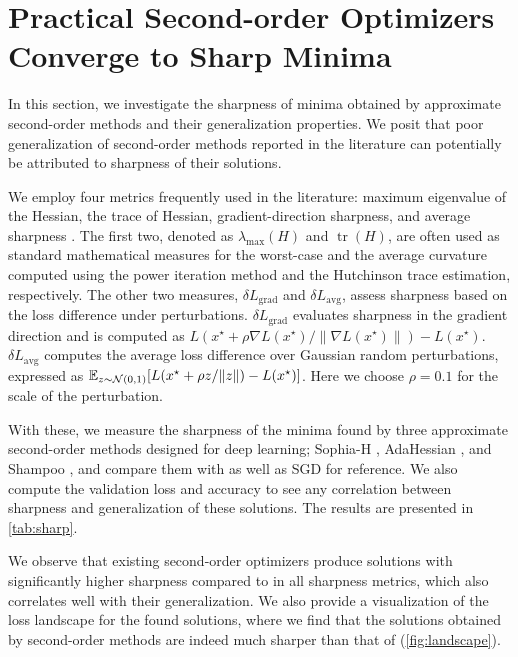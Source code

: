 \section{Practical Second-order Optimizers Converge to Sharp Minima}

In this section, we investigate the sharpness of minima obtained by approximate second-order methods and their generalization properties.
We posit that poor generalization of second-order methods reported in the literature \citep{amari2021when, wadia2021whitening} can potentially be attributed to sharpness of their solutions.

We employ four metrics frequently used in the literature: maximum eigenvalue of the Hessian, the trace of Hessian, gradient-direction sharpness, and average sharpness \citep{Hochreiter1997, jastrzkebski2018relation, xie2020diffusion, saf, chenvision}.
The first two, denoted as $\lambda_{\max}(H)$ and $\operatorname{tr}(H)$, are often used as standard mathematical measures for the worst-case and the average curvature computed using the power iteration method and the Hutchinson trace estimation, respectively.
The other two measures, $\delta L_\text{grad}$ and $\delta L_\text{avg}$, assess sharpness based on the loss difference under perturbations.
$\delta L_\text{grad}$ evaluates sharpness in the gradient direction and is computed as $L(x^\star+\rho\nabla L(x^\star)/\|\nabla L(x^\star)\|)-L(x^\star)$.
$\delta L_\text{avg}$ computes the average loss difference over Gaussian random perturbations, expressed as
$\mathbb{E}_{z\sim \mathcal{N}(0, 1)}[L(x^\star+\rho z/\|z\|)-L(x^\star)]$.
Here we choose $\rho=0.1$ for the scale of the perturbation.

With these, we measure the sharpness of the minima found by three approximate second-order methods designed for deep learning; Sophia-H \citep{sophia}, AdaHessian \citep{adahessian}, and Shampoo \citep{gupta2018shampoo}, and compare them with \sassha as well as SGD for reference.
We also compute the validation loss and accuracy to see any correlation between sharpness and generalization of these solutions.
The results are presented in \cref{tab:sharp}.

We observe that existing second-order optimizers produce solutions with significantly higher sharpness compared to \sassha in all sharpness metrics, which also correlates well with their generalization.
We also provide a visualization of the loss landscape for the found solutions, where we find that the solutions obtained by second-order methods are indeed much sharper than that of \sassha (\cref{fig:landscape}).
